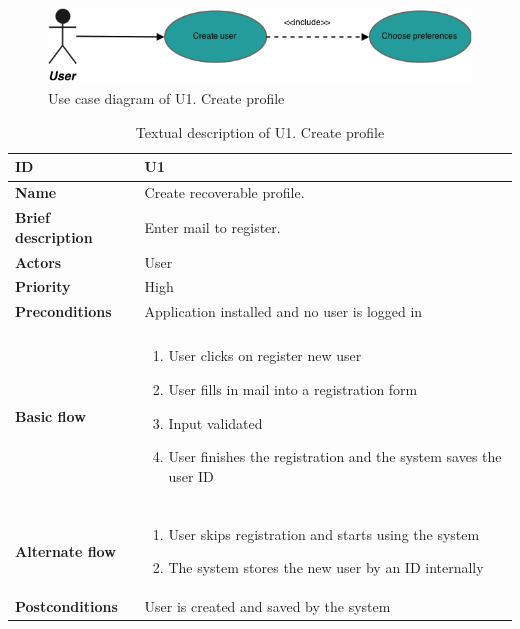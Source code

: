 \clearpage
\begin{figure}[hp]
	\includegraphics[width=\textwidth]{fig/U1}
	\centering
	\caption{Use case diagram of U1. Create profile}
	\label{Fig:U1}
\end{figure}

\begin{table}[hp]
	\renewcommand{\arraystretch}{1.5}
	\centering
	\caption{Textual description of U1. Create profile}
	\begin{tabular}[b]{|l | l|}\hline
		\textbf{ID} 				& U1									\\\hline
		\textbf{Name} 				& Create recoverable profile.			\\\hline
		\textbf{Brief description}	& Enter mail to register. 				\\\hline
		\textbf{Actors} 			& User									\\\hline
		\textbf{Priority}			& High									\\\hline
		\textbf{Preconditions}		& Application installed	and no user is logged in				\\\hline&\\[-2ex]
		\textbf{Basic flow}			& \begin{minipage}{5in}
									  \begin{enumerate}[noitemsep]
										\item User clicks on register new user
										\item User fills in mail into a registration form
										\item Input validated
										\item User finishes the registration and the system saves the user ID
									  \end{enumerate}						
									  \end{minipage}						\\\hline&\\[-2ex]
		\textbf{Alternate flow}		& \begin{minipage}{5in}
									  \begin{enumerate}[noitemsep]
										\item User skips registration and starts using the system
										\item The system stores the new user by an ID internally
									  \end{enumerate}
									 \end{minipage}							\\\hline
		\textbf{Postconditions}		& User is created and saved by the system\\\hline
	\end{tabular}
	\label{Tab:U1}
\end{table}

